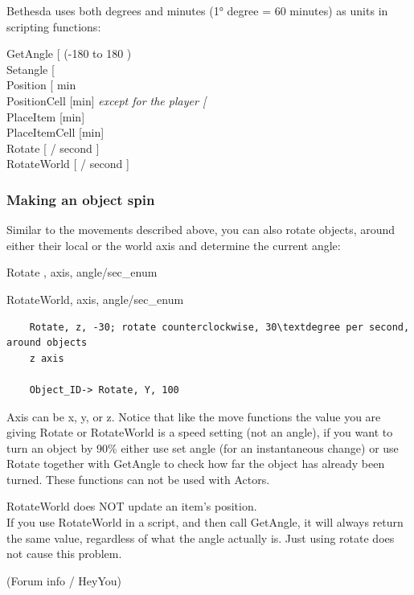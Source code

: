 Bethesda uses both degrees and minutes (1° degree = 60 minutes) as units in scripting functions:

	GetAngle {[}\textdegree{]} (-180 to 180 \textdegree)\\
	Setangle {[}\textdegree{]}\\
	Position {[} min \textdegree{]}\\
	PositionCell {[}min{]} \emph{except for the player {[}\textdegree{]}}\\
	PlaceItem {[}min{]}\\
	PlaceItemCell {[}min{]}\\
	Rotate {[} \textdegree / second {]}\\
	RotateWorld {[} \textdegree / second {]}

\hypertarget{making-an-object-spin}{%
\subsubsection{Making an object spin}\label{making-an-object-spin}}

Similar to the movements described above, you can also rotate objects,
around either their local or the world axis and determine the current
angle:


	Rotate , axis, angle/sec\_enum
	
	RotateWorld, axis, angle/sec\_enum

\begin{lstlisting}	
	Rotate, z, -30; rotate counterclockwise, 30\textdegree per second, around objects
	z axis
	
	Object_ID-> Rotate, Y, 100
\end{lstlisting}

Axis can be x, y, or z. Notice that like the move functions the value
you are giving Rotate or RotateWorld is a speed setting (not an angle),
if you want to turn an object by 90\% either use set angle (for an
instantaneous change) or use Rotate together with GetAngle to check how
far the object has already been turned. These functions can not be used
with Actors.

RotateWorld does NOT update an item's position.\\
If you use RotateWorld in a script, and then call GetAngle, it will
always return the same value, regardless of what the angle actually is.
Just using rotate does not cause this problem.

(Forum info / HeyYou)

